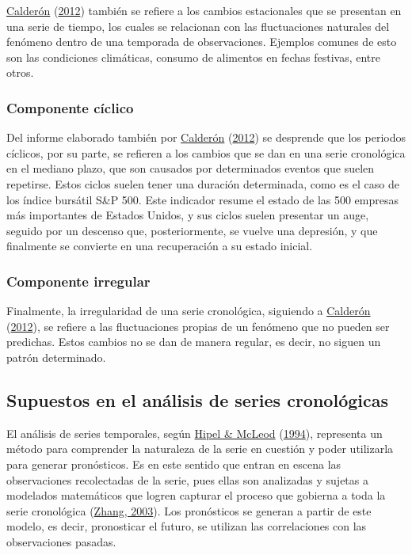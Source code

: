 \documentclass[
]{article}
\begin{document}
\protect\hyperlink{ref-calderon2012estadistica}{Calderón}
(\protect\hyperlink{ref-calderon2012estadistica}{2012}) también se
refiere a los cambios estacionales que se presentan en una serie de
tiempo, los cuales se relacionan con las fluctuaciones naturales del
fenómeno dentro de una temporada de observaciones. Ejemplos comunes de
esto son las condiciones climáticas, consumo de alimentos en fechas
festivas, entre otros.

\subsubsection{Componente cíclico}

Del informe elaborado también por
\protect\hyperlink{ref-calderon2012estadistica}{Calderón}
(\protect\hyperlink{ref-calderon2012estadistica}{2012}) se desprende que
los periodos cíclicos, por su parte, se refieren a los cambios que se
dan en una serie cronológica en el mediano plazo, que son causados por
determinados eventos que suelen repetirse. Estos ciclos suelen tener una
duración determinada, como es el caso de los índice bursátil S\&P 500.
Este indicador resume el estado de las 500 empresas más importantes de
Estados Unidos, y sus ciclos suelen presentar un auge, seguido por un
descenso que, posteriormente, se vuelve una depresión, y que finalmente
se convierte en una recuperación a su estado inicial.

\subsubsection{Componente irregular}

Finalmente, la irregularidad de una serie cronológica, siguiendo a
\protect\hyperlink{ref-calderon2012estadistica}{Calderón}
(\protect\hyperlink{ref-calderon2012estadistica}{2012}), se refiere a
las fluctuaciones propias de un fenómeno que no pueden ser predichas.
Estos cambios no se dan de manera regular, es decir, no siguen un patrón
determinado.

\subsection{Supuestos en el análisis de series cronológicas}

El análisis de series temporales, según
\protect\hyperlink{ref-Hipel}{Hipel \& McLeod}
(\protect\hyperlink{ref-Hipel}{1994}), representa un método para
comprender la naturaleza de la serie en cuestión y poder utilizarla para
generar pronósticos. Es en este sentido que entran en escena las
observaciones recolectadas de la serie, pues ellas son analizadas y
sujetas a modelados matemáticos que logren capturar el proceso que
gobierna a toda la serie cronológica
(\protect\hyperlink{ref-Zhang}{Zhang, 2003}). Los pronósticos se generan
a partir de este modelo, es decir, pronosticar el futuro, se utilizan
las correlaciones con las observaciones pasadas.
\end{document}
